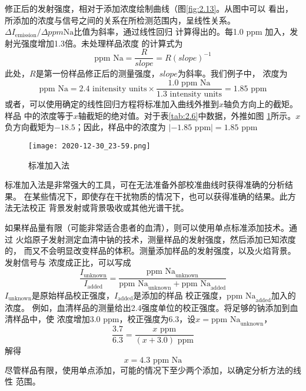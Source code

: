 修正后的发射强度，相对于添加浓度绘制曲线（图\ref{fig:2.13}。从图中可以
看出，所添加的浓度与信号之间的关系在所检测范围内，呈线性关系。
$\Delta I_{\text{emission}}/\Delta ppm \text{Na}$比值为斜率，通过线性回归
计算得出的。每1.0 ppm 加入，发射光强度增加1.3倍。未处理样品浓度
的计算式为
\[
    \text{ppm Na} = \frac{R}{slope} = R(slope)^{-1}
\]
此处，$R$是第一份样品修正后的测量强度，$slope$为斜率。我们例子中，
浓度为
\[
    \text{ppm Na}=2.4 \text{ initensity units}
    \times\frac{1.0 \text{ ppm Na}}{1.3 \text{ intensity units}}
    = 1.85 \text{ ppm}
\]
或者，可以使用确定的线性回归方程将标准加入曲线外推到$x$轴负方向上的截矩。样品
中的浓度等于$x$轴截矩的绝对值。对于表\ref{tab:2.6}中数据，外推如图
\ref{fig:2.14}所示。$x$负方向截矩为$-18.5$；因此，样品中的浓度为
$|-1.85 \text{ ppm}| = 1.85\text{ ppm}$
\begin{figure}[htpb]
    \centering
    \texttt{[image: 2020-12-30\_23-59.png]}
    \caption{标准加入法}
    \label{fig:2.14}
\end{figure}
标准加入法是非常强大的工具，可在无法准备外部校准曲线时获得准确的分析结果。
在某些情况下，即使存在干扰物质的情况下，也可以获得准确的结果。此方法无法校正
背景发射或背景吸收或其他光谱干扰。

如果样品量有限（可能非常适合患者的血清），则可以使用单点标准添加技术。通过
火焰原子发射测定血清中钠的技术，测量样品的发射强度，然后添加已知浓度的，
而又不会明显改变样品的体积。测量添加样品的发射强度，以及火焰背景。发射信号与
浓度成正比，可以写成
\[
    \frac{I_{\text{unknown}}}{I_{\text{added}}} =
    \frac{\text{ppm Na}_{\text{unknown}}}
    {\text{ppm Na}_{\text{unknown}} + \text{ppm Na}_{\text{added}}}
\]
$I_{\text{unknown}}$是原始样品校正强度，$I_{\text{added}}$是添加的样品
校正强度，$\text{ppm Na}_{\text{added}}$加入的浓度。
例如，血清样品的测量给出2.4强度单位的校正强度。将足够的钠添加到血清样品中，使
浓度增加3.0 ppm，校正强度为6.3，设$x=\text{ppm Na}_{\text{unknown}}$，
\[
    \frac{3.7}{6.3}=\frac{x\text{ ppm}}{(x + 3.0)\text{ ppm}}
\]
解得
\[
    x = 4.3\text{ ppm Na}
\]
尽管样品有限，使用单点添加，可能的情况下至少两个添加，以确定分析方法的线性
范围。
